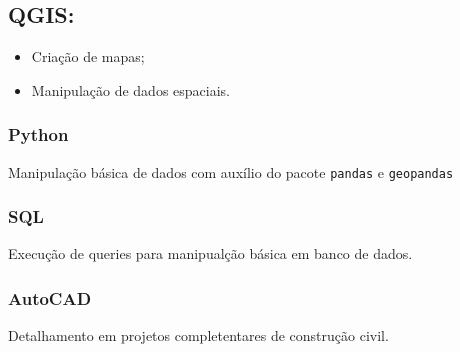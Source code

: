 \documentclass[12pt, a4paper]{article}
\begin{document}
\subsection{QGIS:}

\begin{itemize}
   \item Criação de mapas;
   \item Manipulação de dados espaciais.
\end{itemize}



\subsubsection{Python}

Manipulação básica de dados com auxílio do pacote \verb|pandas| e \verb|geopandas|

\subsubsection{SQL}

Execução de queries para manipualção básica em banco de dados.

\subsubsection{AutoCAD}

Detalhamento em projetos completentares de construção civil.


\end{document}
